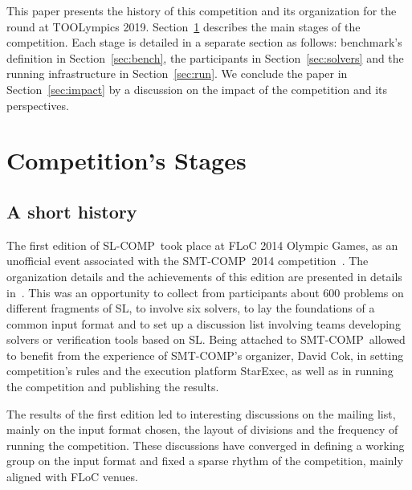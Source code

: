 \documentclass[orivec]{llncs}
\newcommand{\smtcomp}{\textsf{SMT-COMP}}
\newcommand{\slcomp}{\textsf{SL-COMP}}
\newcommand{\starexec}{\textsf{StarExec}}
\begin{document}
This paper presents the history of this competition and its organization for
the round at TOOLympics 2019.
Section~\ref{sec:org} describes the main stages of the competition. 
Each stage is detailed in a separate section as follows:
benchmark's definition in Section~\ref{sec:bench},
the participants in Section~\ref{sec:solvers} and 
the running infrastructure in Section~\ref{sec:run}. %
We conclude the paper in Section~\ref{sec:impact} by a discussion on the impact of the competition and its perspectives.


\section{Competition's Stages}
\label{sec:org}

\subsection{A short history}

The first edition of \slcomp\ took place at FLoC 2014 Olympic Games, 
as an unofficial event associated with the \smtcomp\ 2014 
competition~\cite{SMTCOMPsite}. The organization details and the achievements 
of this edition are presented in details in~\cite{SighireanuC14}.
This was an opportunity 
to collect from participants about 600 problems on different fragments of SL, 
to involve six solvers, to lay the foundations of a common input format and
to set up a discussion list involving teams developing solvers or
verification tools based on SL. 
Being attached to \smtcomp\ allowed to benefit from the experience of
\smtcomp's organizer, David Cok, in setting competition's rules and 
the execution platform \starexec, as well as in running the competition and 
publishing the results.

The results of the first edition led to interesting discussions on the
mailing list, mainly on the input format chosen, the layout of divisions 
and the frequency of running the competition. These discussions have 
converged in defining a working group on the input format and 
fixed a sparse rhythm of the competition, mainly aligned with  FLoC venues.
\end{document}
